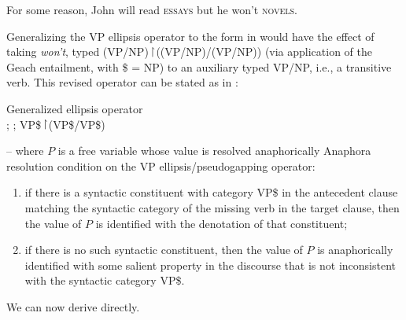 \documentclass[output=paper,colorlinks,citecolor=brown]{langscibook}
\begin{document}
\begin{exe}
 \ex\label{conjPseudo}
  For some reason, John will read \textsc{essays} but he won't \textsc{novels}.
\end{exe}
Generalizing the VP ellipsis operator to the form in 
would have the effect of taking \textit{won't}, typed
(VP/NP)\ensuremath{\vs}((VP/NP)/(VP/NP)) (via application of the Geach entailment, with \$ = NP) to an
auxiliary typed VP/NP, i.e., a transitive verb. This revised operator
can be stated as in :

\begin{exe}
 \ex\label{generalized}
  Generalized ellipsis operator\\
  ; ; VP\$\ensuremath{\vs}(VP\$/VP\$)

   -- where $P$ is a free variable whose value is
  resolved anaphorically
 \ex
  Anaphora resolution condition on the VP ellipsis/pseudogapping
  operator:
  \begin{enumerate}
   \item
    if there is a syntactic  constituent
    with category VP\$ in the antecedent clause matching the
    syntactic  category of the missing verb in the target clause,
    then the value of $P$ is identified with the denotation of that constituent;
   \item
    if there is no such syntactic  constituent, then the value of $P$  is anaphorically
    identified with some salient property in the discourse that is not
    inconsistent with the syntactic  category VP\$.
  \end{enumerate}
\end{exe}
We can now derive  directly.
\end{document}
